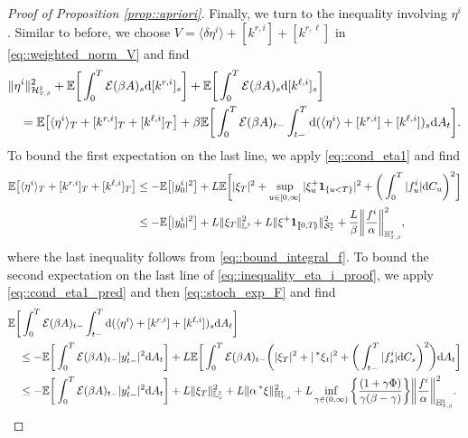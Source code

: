 \documentclass[10pt]{article} %
\newcommand\cE{\mathcal E}
\newcommand\cH{\mathcal H}
\newcommand\cS{\mathcal S}
\newcommand{\smalltext}[1]{\text{\fontsize{4}{4}\selectfont$#1$}}
\def \E{\mathbb{E}}
\def \H{\mathbb{H}}
\def \L{\mathbb{L}}
\newcommand{\brs}[1]{\prescript{\ast}{}{#1}}
\newcommand{\1}{\mathbf{1}}
\def\d{\mathrm{d}}
\begin{document}
\begin{proof}[Proof of Proposition \ref{prop::apriori}]
\medskip
Finally, we turn to the inequality involving $\eta^i$. Similar to before, we choose $V = \langle\delta\eta^i\rangle + [k^{r,i}] + [k^{r,\ell}]$ in \eqref{eq::weighted_norm_V} and find
\begin{align}\label{eq::inequality_eta_i_proof}
	&\|\eta^i\|^2_{\cH^\smalltext{2}_{\smalltext{T}\smalltext{,}\smalltext{\beta}}} + \E\bigg[\int_0^T \cE(\beta A)_s \d [k^{r,i}]_s\bigg] + \E\bigg[\int_0^T \cE(\beta A)_s \d [k^{\ell,i}]_s\bigg] \nonumber\\
	&\quad= \E\big[ \langle \eta^i \rangle_T + [k^{r,i}]_T + [k^{\ell,i}]_T \big] + \beta \E \bigg[ \int_0^T \cE(\beta A)_{t-} \int_{t-}^T \d (\langle\eta^i \rangle + [k^{r,i}] + [k^{\ell,i}])_s \d A_t \bigg].
\end{align}
To bound the first expectation on the last line, we apply \eqref{eq::cond_eta1} and find
\begin{align*}
	\E\big[ \langle \eta^i \rangle_T + [k^{r,i}]_T + [k^{\ell,i}]_T \big] 
	&\leq -\E\big[|y^i_0|^2\big] + L \E\bigg[ |\xi_T|^2 + \sup_{u \in [0,\infty]} |\xi^+_u \mathbf{1}_{\{u < T\}}|^2 + \bigg(\int_0^T |f^i_u| \d C_u\bigg)^2 \bigg] \\
	&\leq -\E\big[|y^i_0|^2\big] + L \|\xi_T\|^2_{\L^\smalltext{2}} + L\|\xi^+\1_{\llbracket 0,T\rrparenthesis}\|^2_{\cS^\smalltext{2}_\smalltext{T}} + \frac{L}{\beta} \bigg\|\frac{f^i}{\alpha}\bigg\|^2_{\H^\smalltext{2}_{\smalltext{T}\smalltext{,}\smalltext{\beta}}},
\end{align*}
where the last inequality follows from \eqref{eq::bound_integral_f}. To bound the second expectation on the last line of \eqref{eq::inequality_eta_i_proof}, we apply \eqref{eq::cond_eta1_pred} and then \eqref{eq::stoch_exp_F} and find
\begin{align*}
	&\E\bigg[ \int_0^T \cE(\beta A)_{t-} \int_{t-}^T \d (\langle\eta^i \rangle + [k^{r,i}] + [k^{\ell,i}])_s \d A_t \bigg] \\
	&\quad \leq - \E\bigg[\int_0^T \cE(\beta A)_{t-} |y^i_{t-}|^2\d A_t\bigg] + L\E\bigg[ \int_0^T \cE(\beta A)_{t-} \bigg(|\xi_T|^2 + |\brs{\xi}_t|^2 +  \bigg(\int_{t-}^T |f^i_s|\d C_s\bigg)^2\bigg) \d A_t \bigg] \\
	&\quad\leq - \E\bigg[\int_0^T \cE(\beta A)_{t-} |y^i_{t-}|^2\d A_t\bigg] +  L\|\xi_T\|^2_{\L^\smalltext{2}_\smalltext{\beta}} + L\| \alpha\brs{\xi}\|^2_{\H^\smalltext{2}_{\smalltext{T}\smalltext{,}\smalltext{\beta}}} + L\inf_{\gamma \in (0,\infty)} \bigg\{\frac{(1+\gamma\Phi)}{\gamma(\beta-\gamma)}\bigg\} \bigg\|\frac{f^i}{\alpha}\bigg\|^2_{\H^\smalltext{2}_{\smalltext{T}\smalltext{,}\smalltext{\beta}}}.

\end{align*}
\end{proof}
\end{document}
